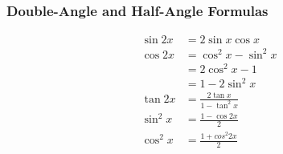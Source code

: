 \documentclass[12pt]{article}
\begin{document}
\subsubsection{Double-Angle and Half-Angle Formulas}

\begin{align*}
  \sin 2x &= 2 \sin x \cos x\\
  \cos 2x &= \cos^2 x - \sin^2 x\\
          &= 2 \cos^2 x - 1\\
          &= 1 - 2 \sin^2 x\\
  \tan 2x &= \frac{2 \tan x}{1 - \tan^2 x}\\
  \sin^2 x &= \frac{1-\cos 2x}{2}\\
  \cos^2 x &= \frac{1+cos^2 2x}{2}
\end{align*}
\end{document}

